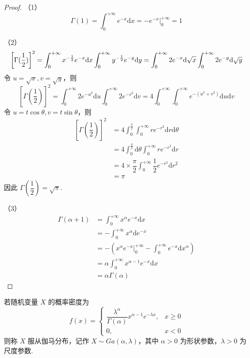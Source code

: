 \begin{proof}
    （1）
    $$
    \Gamma(1) = \int_{0}^{+\infty} e^{-x} \text{d}x = -e^{-x} \Big|_0^{+\infty} = 1
    $$

    （2）
    $$
    \left[ \Gamma(\dfrac{1}{2}) \right]^2 = \int_{0}^{+\infty} x^{-\frac{1}{2}} e^{-x} \text{d}x \int_{0}^{+\infty} y^{-\frac{1}{2}} e^{-y} \text{d}y = \int_{0}^{+\infty} 2 e^{-x} \text{d} \sqrt{x} \int_{0}^{+\infty} 2 e^{-y} \text{d} \sqrt{y} \\
    $$
    令 $u = \sqrt{x}, v = \sqrt{y}$，则
    $$
    \left[ \Gamma(\dfrac{1}{2}) \right]^2 = \int_{0}^{+\infty} 2 e^{-u^2} \text{d}u \int_{0}^{+\infty} 2 e^{-v^2} \text{d}v = 4 \int_{0}^{+\infty} \int_{0}^{+\infty} e^{-(u^2 + v^2)} \text{d}u \text{d}v
    $$
    令 $u = t \cos\theta, v = t \sin\theta$，则
    $$
    \begin{aligned}
        \left[ \Gamma(\dfrac{1}{2}) \right]^2 &= 4 \int_{0}^{\frac{\pi}{2}} \int_{0}^{+\infty} r e^{-r^2} \text{d}r \text{d} \theta \\
        &= 4 \int_{0}^{\frac{\pi}{2}} \text{d} \theta \int_{0}^{+\infty} r e^{-r^2} \text{d}r \\
        &= 4 \times \dfrac{\pi}{2} \int_{0}^{+\infty} \dfrac{1}{2} e^{-r^2} \text{d}r^2 \\
        &= \pi
    \end{aligned}
    $$
    因此 $\Gamma(\dfrac{1}{2}) = \sqrt{\pi}$.

    （3）
    $$
    \begin{aligned}
        \Gamma(\alpha + 1) &= \int_{0}^{+\infty} x^{\alpha} e^{-x} \text{d}x \\
        &= -\int_{0}^{+\infty} x^{\alpha} \text{d} e^{-x} \\
        &= -\left( x^{\alpha} e^{-x} \Big|_0^{+\infty} - \int_{0}^{+\infty} e^{-x} \text{d} x^{\alpha} \right) \\
        &= \alpha \int_{0}^{+\infty} x^{\alpha - 1} e^{-x} \text{d}x \\
        &= \alpha \Gamma(\alpha)
    \end{aligned}
    $$
\end{proof}

\begin{definition}
    \indent 若随机变量 $X$ 的概率密度为
    $$
    f(x) = \begin{cases}
        \dfrac{\lambda^\alpha}{\Gamma(\alpha)} x^{\alpha - 1} e^{-\lambda x}, & x \geqslant 0 \\[0.5em]
        0, & x<0
    \end{cases}
    $$
    则称 $X$ 服从{\heiti 伽马分布}，记作 $X \sim Ga(\alpha,\lambda)$，其中 $\alpha > 0$ 为形状参数，$\lambda > 0$ 为尺度参数.
\end{definition}

